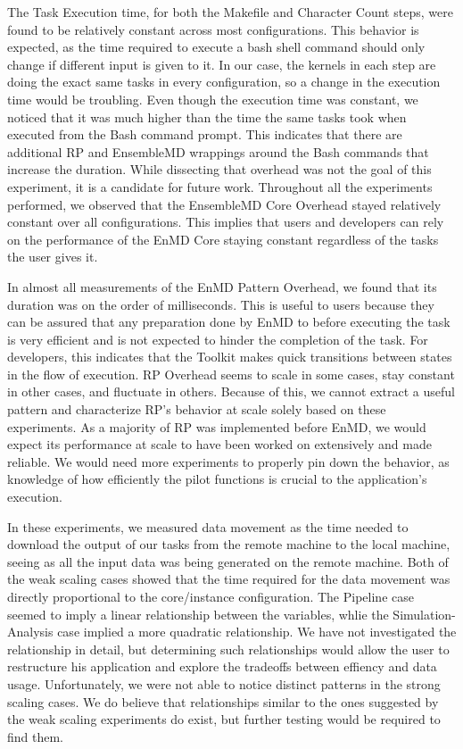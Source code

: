 \documentclass[]{article}
\begin{document}
	The Task Execution time, for both the Makefile and Character Count steps, were found to be relatively constant across most configurations. This behavior is expected, as the time required to execute a bash shell command should only change if different input is given to it. In our case, the kernels in each step are doing the exact same tasks in every configuration, so a change in the execution time would be troubling. Even though the execution time was constant, we noticed that it was much higher than the time the same tasks took when executed from the Bash command prompt. This indicates that there are additional RP and EnsembleMD wrappings around the Bash commands that increase the duration. While dissecting that overhead was not the goal of this experiment, it is a candidate for future work.
	Throughout all the experiments performed, we observed that the EnsembleMD Core Overhead stayed relatively constant over all configurations. This implies that users and developers can rely on the performance of the EnMD Core staying constant regardless of the tasks the user gives it.
	
	In almost all measurements of the EnMD Pattern Overhead, we found that its duration was on the order of milliseconds. This is useful to users because they can be assured that any preparation done by EnMD to before executing the task is very efficient and is not expected to hinder the completion of the task. For developers, this indicates that the Toolkit makes quick transitions between states in the flow of execution.
	RP Overhead seems to scale in some cases, stay constant in other cases, and fluctuate in others. Because of this, we cannot extract a useful pattern and characterize RP's behavior at scale solely based on these experiments. As a majority of RP was implemented before EnMD, we would expect its performance at scale to have been worked on extensively and made reliable. We would need more experiments to properly pin down the behavior, as knowledge of how efficiently the pilot functions is crucial to the application's execution.

    In these experiments, we measured data movement as the time needed to download the output of our tasks from the remote machine to the local machine, seeing as all the input data was being generated on the remote machine. Both of the weak scaling cases showed that the time required for the data movement was directly proportional to the core/instance configuration. The Pipeline case seemed to imply a linear relationship between the variables, whlie the Simulation-Analysis case implied a more quadratic relationship. We have not investigated the relationship in detail, but determining such relationships would allow the user to restructure his application and explore the tradeoffs between effiency and data usage. Unfortunately, we were not able to notice distinct patterns in the strong scaling cases. We do believe that relationships similar to the ones suggested by the weak scaling experiments do exist, but further testing would be required to find them.
\end{document}
